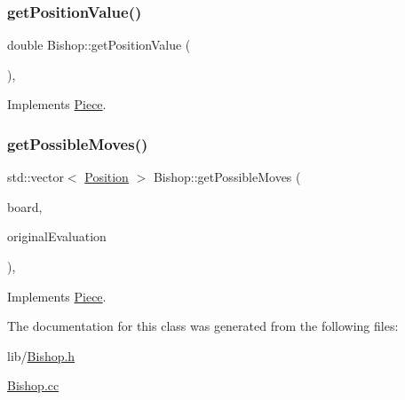 \subsubsection{\texorpdfstring{get\+Position\+Value()}{getPositionValue()}}
{\footnotesize\ttfamily double Bishop\+::get\+Position\+Value (\begin{DoxyParamCaption}{ }\end{DoxyParamCaption})\hspace{0.3cm}{\ttfamily [override]}, {\ttfamily [virtual]}}



Implements \hyperlink{class_piece_a4adfa58b4f0368c9a5859afcf294e0a4}{Piece}.

\mbox{\label{class_bishop_aed393094415a51e98e0c300da7f79100}} 
\subsubsection{\texorpdfstring{get\+Possible\+Moves()}{getPossibleMoves()}}
{\footnotesize\ttfamily std\+::vector$<$ \hyperlink{struct_position}{Position} $>$ Bishop\+::get\+Possible\+Moves (\begin{DoxyParamCaption}\item[{std\+::shared\+\_\+ptr$<$ \hyperlink{class_base_board}{Base\+Board} $>$}]{board,  }\item[{bool}]{original\+Evaluation }\end{DoxyParamCaption})\hspace{0.3cm}{\ttfamily [override]}, {\ttfamily [virtual]}}



Implements \hyperlink{class_piece_a8891924c280568529878549f59541925}{Piece}.



The documentation for this class was generated from the following files\+:\begin{DoxyCompactItemize}
\item 
lib/\hyperlink{_bishop_8h}{Bishop.\+h}\item 
\hyperlink{_bishop_8cc}{Bishop.\+cc}\end{DoxyCompactItemize}
